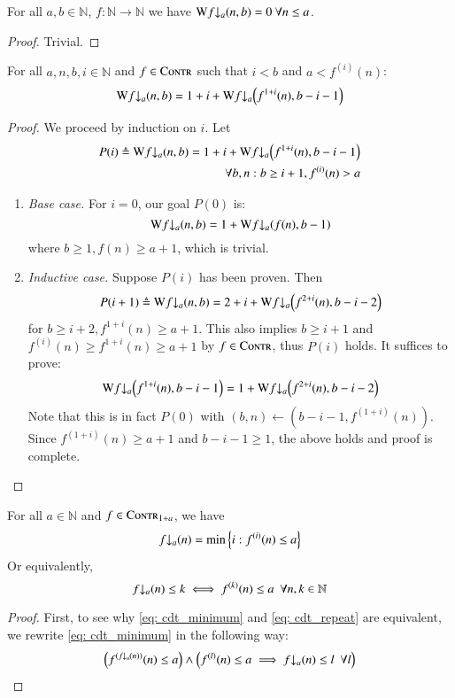 \begin{lem} \label{lem: cdt_init}
For all $a, b\in \mathbb{N}$, $f : \mathbb{N}\to \mathbb{N}$ we have $\W\cdt{f}{a} (n, b) = 0 \ \forall n\le a$.
\end{lem}
\begin{proof}
Trivial.
\end{proof}

\begin{lem} \label{lem: cdt_intermediate}
For all $a, n, b, i\in \mathbb{N}$ and $f \in \text{\scshape{Contr}}$ such that $i < b$ and $a < f^{(i)}(n)$:
\begin{equation}  \label{eq: cdt_intermediate}
\W\cdt{f}{a}(n, b) = 1 + i + \W\cdt{f}{a}\left(f^{1+i}(n), b - i - 1\right)
\end{equation}
\end{lem}
\begin{proof}
We proceed by induction on $i$. Let
$$\begin{aligned}
 P(i) \triangleq \W\cdt{f}{a}(n, b) = 1 + i + \W\cdt{f}{a}\left(f^{1+i}(n), b - i - 1\right) \\ \forall b, n : b\ge i+1, f^{(i)}(n) > a
\end{aligned}$$
\begin{enumerate}[leftmargin=*]
	\item \textit{Base case.} For $i = 0$, our goal $P(0)$ is:
	$$ \W\cdt{f}{a}(n, b) = 1 + \W\cdt{f}{a}\left(f(n), b - 1\right) $$
	where $b \ge 1, f(n)\ge a+1$, which is trivial.
	\item \textit{Inductive case.} Suppose $P(i)$ has been proven. Then
	$$ P(i+1) \triangleq \W\cdt{f}{a}(n, b) = 2 + i + \W\cdt{f}{a}\left( f^{2+i}(n), b - i - 2 \right)$$
	for $b \ge i+2, f^{1+i}(n) \ge a+1$. This also implies $b\ge i+1$ and $f^{(i)}(n) \ge f^{1+i}(n)\ge a+1$ by $f\in \text{\scshape{Contr}}$, thus $P(i)$ holds. It suffices to prove:
	$$ \W\cdt{f}{a}\left(f^{1+i}(n), b-i-1\right) = 1 + \W\cdt{f}{a}\left( f^{2+i}(n), b-i-2 \right)$$
	Note that this is in fact $P(0)$ with $(b, n) \leftarrow \left(b-i-1, f^{(1+i)}(n)\right)$. Since $f^{(1+i)}(n) \ge a+1$ and $b-i-1\ge 1$, the above holds and proof is complete. 
\end{enumerate}
\end{proof}

\begin{thm} \label{thm: cdt_repeat}
For all $a\in \mathbb{N}$ and $f\in \text{\scshape{Contr}}_{1+a}$, we have
\begin{equation} \label{eq: cdt_minimum}
\cdt{f}{a}(n) = \min\left\{ i : f^{(i)}(n) \le a \right\}
\end{equation}
Or equivalently,
\begin{equation} \label{eq: cdt_repeat}
\cdt{f}{a}(n) \le k \iff f^{(k)}(n) \le a \ \ \forall n, k \in \mathbb{N}
\end{equation}
\end{thm}
\begin{proof}
First, to see why \eqref{eq: cdt_minimum} and \eqref{eq: cdt_repeat} are equivalent, we rewrite \eqref{eq: cdt_minimum} in the following way:
$$ \left(f^{(\cdt{f}{a}(n))}(n) \le a\right) \wedge \left(f^{(l)}(n) \le a \implies \cdt{f}{a}(n) \le l \ \ \forall l\right)$$

\end{proof}